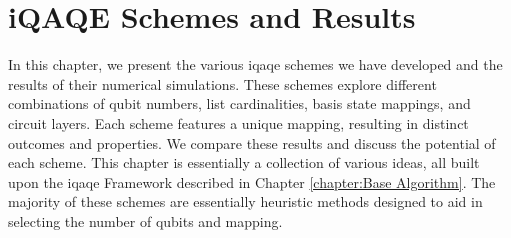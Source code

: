 
\chapter{iQAQE Schemes and Results}
\label{chapter:Schemes_and_Results}






In this chapter, we present the various \acrshort{iqaqe} schemes we have developed and the results of their numerical simulations. These schemes explore different combinations of qubit numbers, list cardinalities, basis state mappings, and circuit layers. Each scheme features a unique mapping, resulting in distinct outcomes and properties. We compare these results and discuss the potential of each scheme. This chapter is essentially a collection of various ideas, all built upon the \acrshort{iqaqe} Framework described in Chapter \ref{chapter:Base Algorithm}. The majority of these schemes are essentially heuristic methods designed to aid in selecting the number of qubits and mapping.

